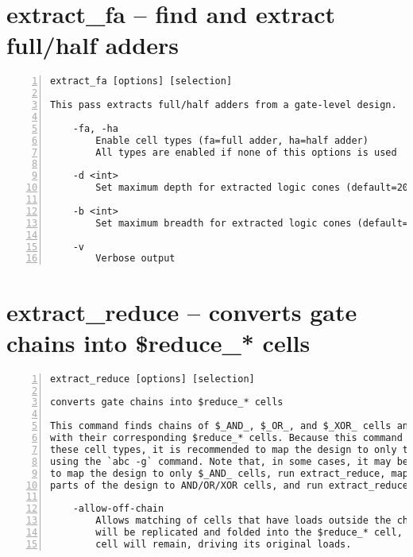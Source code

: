 \section{extract\_fa -- find and extract full/half adders}
\label{cmd:extract_fa}
\begin{lstlisting}[numbers=left,frame=single]
    extract_fa [options] [selection]

This pass extracts full/half adders from a gate-level design.

    -fa, -ha
        Enable cell types (fa=full adder, ha=half adder)
        All types are enabled if none of this options is used

    -d <int>
        Set maximum depth for extracted logic cones (default=20)

    -b <int>
        Set maximum breadth for extracted logic cones (default=6)

    -v
        Verbose output
\end{lstlisting}

\section{extract\_reduce -- converts gate chains into \$reduce\_* cells}
\label{cmd:extract_reduce}
\begin{lstlisting}[numbers=left,frame=single]
    extract_reduce [options] [selection]

converts gate chains into $reduce_* cells

This command finds chains of $_AND_, $_OR_, and $_XOR_ cells and replaces them
with their corresponding $reduce_* cells. Because this command only operates on
these cell types, it is recommended to map the design to only these cell types
using the `abc -g` command. Note that, in some cases, it may be more effective
to map the design to only $_AND_ cells, run extract_reduce, map the remaining
parts of the design to AND/OR/XOR cells, and run extract_reduce a second time.

    -allow-off-chain
        Allows matching of cells that have loads outside the chain. These cells
        will be replicated and folded into the $reduce_* cell, but the original
        cell will remain, driving its original loads.
\end{lstlisting}

